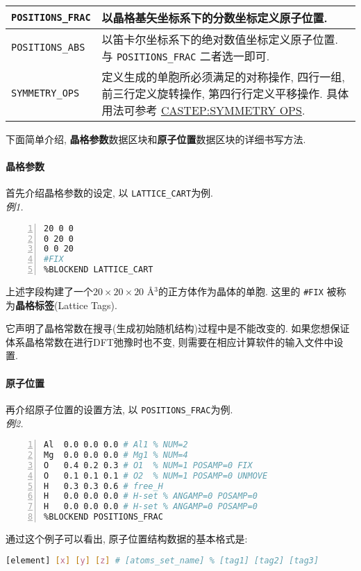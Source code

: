 \documentclass[a4paper, 10pt]{article}
\begin{document}
\begin{center}
\begin{longtable}{m{13em}<{\centering} | m{19em}}
\midrule
 \verb|POSITIONS_FRAC| & 以晶格基矢坐标系下的分数坐标定义原子位置.\\
\midrule
 \verb|POSITIONS_ABS| & 以笛卡尔坐标系下的绝对数值坐标定义原子位置. 与 \verb|POSITIONS_FRAC| 二者选一即可.\\
\midrule
 \verb|SYMMETRY_OPS| & 定义生成的单胞所必须满足的对称操作, 四行一组, 前三行定义旋转操作, 第四行行定义平移操作. 具体用法可参考 \href{http://www.tcm.phy.cam.ac.uk/castep/documentation/WebHelp/content/modules/castep/keywords/k_symmetry_ops_castep.htm}{CASTEP:SYMMETRY OPS}.\\
\bottomrule
\end{longtable}
\end{center}

下面简单介绍, \textbf{晶格参数}数据区块和\textbf{原子位置}数据区块的详细书写方法.

\paragraph{晶格参数} 首先介绍晶格参数的设定, 以 \verb|LATTICE_CART|为例.\\
\emph{例1.}
\begin{lstlisting}[language={bash},numbers=left]
%BLOCK LATTICE_CART
20 0 0
0 20 0
0 0 20
#FIX
%BLOCKEND LATTICE_CART
\end{lstlisting}

上述字段构建了一个\(20\times20\times20\) \r{A}\(^3\)的正方体作为晶体的单胞. 这里的 \verb|#FIX| 被称为\textbf{晶格标签}(Lattice Tags). 

它声明了晶格常数在搜寻(生成初始随机结构)过程中是不能改变的. 如果您想保证体系晶格常数在进行DFT弛豫时也不变, 则需要在相应计算软件的输入文件中设置.


\paragraph{原子位置} 再介绍原子位置的设置方法, 以 \verb|POSITIONS_FRAC|为例.\\
\emph{例2.}
\begin{lstlisting}[language={bash},numbers=left]
%BLOCK POSITIONS_FRAC
Al  0.0 0.0 0.0 # Al1 % NUM=2 
Mg  0.0 0.0 0.0 # Mg1 % NUM=4 
O   0.4 0.2 0.3 # O1  % NUM=1 POSAMP=0 FIX
O   0.1 0.1 0.1 # O2  % NUM=1 POSAMP=0 UNMOVE
H   0.3 0.3 0.6 # free_H 
H   0.0 0.0 0.0 # H-set % ANGAMP=0 POSAMP=0
H   0.0 0.0 0.0 # H-set % ANGAMP=0 POSAMP=0
%BLOCKEND POSITIONS_FRAC
\end{lstlisting}

通过这个例子可以看出, 原子位置结构数据的基本格式是:
\begin{lstlisting}[language={bash}]
[element] [x] [y] [z] # [atoms_set_name] % [tag1] [tag2] [tag3]
\end{lstlisting}
\end{document}

